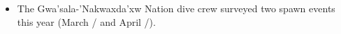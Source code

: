 \begin{itemize}
\item The Gwa'sala-'Nakwaxda'xw Nation dive crew surveyed two spawn events this year
(March / and April /).
\end{itemize}